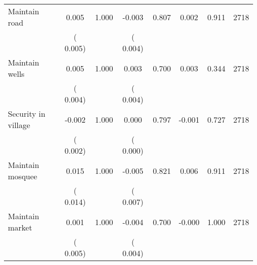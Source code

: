 \begin{tabular}{l*{7}{c}}
 Maintain road       &              0.005       &        1.000  &             -0.003       &        0.807  &              0.002       &              0.911 &  2718 \\ 
                       &       (       0.005)             &                               &       (       0.004)                     &                               &                                               &                                &                      \\ 

 Maintain wells       &              0.005       &        1.000  &              0.003       &        0.700  &              0.003       &              0.344 &  2718 \\ 
                       &       (       0.004)             &                               &       (       0.004)                     &                               &                                               &                                &                      \\ 

 Security in village       &             -0.002       &        1.000  &              0.000       &        0.797  &             -0.001       &              0.727 &  2718 \\ 
                       &       (       0.002)             &                               &       (       0.000)                     &                               &                                               &                                &                      \\ 

 Maintain mosquee       &              0.015       &        1.000  &             -0.005       &        0.821  &              0.006       &              0.911 &  2718 \\ 
                       &       (       0.014)             &                               &       (       0.007)                     &                               &                                               &                                &                      \\ 

 Maintain market       &              0.001       &        1.000  &             -0.004       &        0.700  &             -0.000       &              1.000 &  2718 \\ 
                       &       (       0.005)             &                               &       (       0.004)                     &                               &                                               &                                &                      \\ 


\end{tabular}
